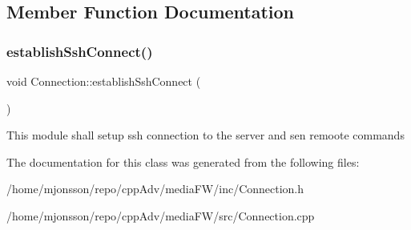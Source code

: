 \subsection{Member Function Documentation}
\mbox{\label{classConnection_a6ff354280eacd558865f34d95a1bfa95}} 
\subsubsection{\texorpdfstring{establish\+Ssh\+Connect()}{establishSshConnect()}}
{\footnotesize\ttfamily void Connection\+::establish\+Ssh\+Connect (\begin{DoxyParamCaption}{ }\end{DoxyParamCaption})\hspace{0.3cm}{\ttfamily [private]}}

This module shall setup ssh connection to the server and sen remoote commands 

The documentation for this class was generated from the following files\+:\begin{DoxyCompactItemize}
\item 
/home/mjonsson/repo/cpp\+Adv/media\+F\+W/inc/Connection.\+h\item 
/home/mjonsson/repo/cpp\+Adv/media\+F\+W/src/Connection.\+cpp\end{DoxyCompactItemize}
